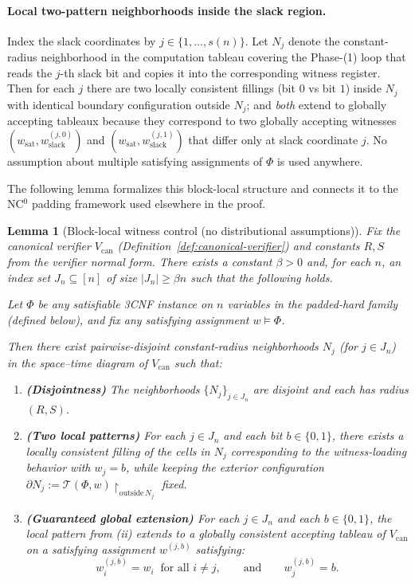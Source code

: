 \documentclass[12pt]{article}
\newtheorem{lemma}[theorem]{Lemma}
\theoremstyle{definition}
\theoremstyle{definition}
\theoremstyle{remark}
\theoremstyle{remark}
\begin{document}
\paragraph{Local two-pattern neighborhoods inside the slack region.}
Index the slack coordinates by $j\in\{1,\dots,s(n)\}$.
Let $N_j$ denote the constant-radius neighborhood in the computation tableau covering the
Phase-(1) loop that reads the $j$-th slack bit and copies it into the corresponding witness register.
Then for each $j$ there are two locally consistent fillings (bit $0$ vs bit $1$) inside $N_j$
with identical boundary configuration outside $N_j$; and \emph{both} extend to globally accepting
tableaux because they correspond to two globally accepting witnesses
$(w_{\mathrm{sat}},w_{\mathrm{slack}}^{(j,0)})$ and $(w_{\mathrm{sat}},w_{\mathrm{slack}}^{(j,1)})$
that differ only at slack coordinate $j$.
No assumption about multiple satisfying assignments of $\Phi$ is used anywhere.

The following lemma formalizes this block-local structure and connects it to
the NC$^0$ padding framework used elsewhere in the proof.

\begin{lemma}[Block-local witness control (no distributional assumptions)]
\label{lem:block-local-control}
Fix the canonical verifier $V_{\mathrm{can}}$ (Definition~\ref{def:canonical-verifier}) and constants $R,S$
from the verifier normal form. There exists a constant $\beta>0$ and, for each $n$, an index set
$J_n\subseteq [n]$ of size $|J_n|\ge \beta n$ such that the following holds.

Let $\Phi$ be any satisfiable 3CNF instance on $n$ variables in the padded-hard family
(defined below), and fix any satisfying assignment $w\models \Phi$.

Then there exist pairwise-disjoint constant-radius neighborhoods
$N_j$ (for $j\in J_n$) in the space--time diagram of $V_{\mathrm{can}}$ such that:

\begin{enumerate}[label=(\roman*)]
\item \textbf{(Disjointness)} The neighborhoods $\{N_j\}_{j\in J_n}$ are disjoint and each has
radius $(R,S)$.

\item \textbf{(Two local patterns)} For each $j\in J_n$ and each bit $b\in\{0,1\}$, there exists a
locally consistent filling of the cells in $N_j$ corresponding to the witness-loading behavior
with $w_j=b$, while keeping the exterior configuration
$\partial N_j := \mathcal{T}(\Phi,w)\!\upharpoonright_{\mathrm{outside}\,N_j}$
fixed.

\item \textbf{(Guaranteed global extension)} For each $j\in J_n$ and each $b\in\{0,1\}$, the local
pattern from (ii) extends to a globally consistent accepting tableau of $V_{\mathrm{can}}$ on a
satisfying assignment $w^{(j,b)}$ satisfying:
\[
w^{(j,b)}_i = w_i \;\; \text{for all } i\neq j,
\qquad\text{and}\qquad
w^{(j,b)}_j = b.
\]
\end{enumerate}
\end{lemma}
\end{document}
